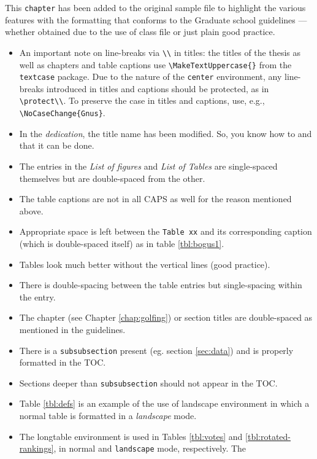 \documentclass[numrefs,sort&compress]{nddiss2e}
\begin{document}
This \verb+chapter+ has been added to the original sample file to highlight the
various features with the formatting that conforms to the Graduate school
guidelines --- whether obtained due to the use of \nddiss\/ class file or just
plain good practice.
\begin{itemize}
\item An important note on line-breaks via \verb+\\+ in titles: the
  titles of the thesis as well as chapters and table captions use
  \verb+\MakeTextUppercase{}+ from the \verb+textcase+ package.  Due
  to the nature of the \verb+center+ environment, any line-breaks
  introduced in titles and captions should be protected, as in
  \verb+\protect\\+.
  To preserve the case in titles and captions, use, e.g.,
  \verb+\NoCaseChange{Gnus}+.
\item In the \emph{dedication}, the title name has been modified. So, you know
how to and that it can be done.
\item The entries in the \emph{List of figures} and \emph{List of Tables} are
single-spaced themselves but are double-spaced from the other.
\item The table captions are not in all CAPS as well for the reason mentioned
above.
\item Appropriate space is left between the \verb+Table xx+ and its
corresponding caption (which is double-spaced itself) as in table \ref{tbl:bogus1}.
\item Tables look much better without the vertical lines (good practice).
\item There is double-spacing between the table entries but single-spacing
within the entry.
\item The chapter (see Chapter \ref{chap:golfing}) or section titles are
double-spaced as mentioned in the guidelines.
\item There is a \verb+subsubsection+ present (eg. section \ref{sec:data}) and
is properly formatted in the TOC.
\item Sections deeper than \verb+subsubsection+ should not appear in the TOC.
\item Table \ref{tbl:defs} is an example of the use of \textsf{landscape}
environment in which a normal table is formatted in a \emph{landscape} mode.
\item The \textsf{longtable} environment is used in Tables \ref{tbl:votes} and
\ref{tbl:rotated-rankings}, in normal and \verb+landscape+ mode, respectively. The

\end{itemize}
\end{document}
